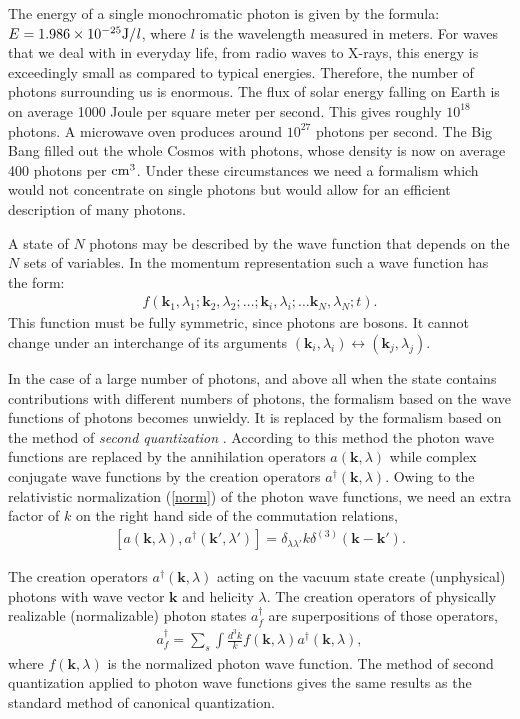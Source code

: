 \documentclass[onecolumn,aps,pra,12pt]{revtex4-1}
\begin{document}
The energy of a single monochromatic photon is given by the formula: $E=1.986\times 10^{-25}\rm{J}/{\it l}$, where $l$ is the wavelength measured in meters.
For waves that we deal with in everyday life, from radio waves to X-rays, this energy is exceedingly small as compared to typical energies. Therefore, the number of photons surrounding us is enormous. The flux of solar energy falling on Earth is on average 1000 Joule per square meter per second. This gives roughly  $10^{18}$ photons. A microwave oven produces around $10^{27}$ photons per second. The Big Bang filled out the whole Cosmos with photons, whose density is now on average 400 photons per $\rm{cm}^3$. Under these circumstances we need a formalism which would not concentrate on single photons but would allow for an efficient description of many photons.

A state of $N$ photons may be described by the wave function that depends on the $N$ sets of variables. In the momentum representation such a wave function has the form:
\begin{align}\label{n}
f({\bm k}_1,\lambda_1;{\bm k}_2,\lambda_2;\dots;{\bm k}_i,\lambda_i;\dots{\bm k}_N,\lambda_N;t).
\end{align}
This function must be fully symmetric, since photons are bosons. It cannot change under an interchange of its arguments $({\bm k}_i,\lambda_i)\leftrightarrow({\bm k}_j,\lambda_j)$.

In the case of a large number of photons, and above all when the state contains contributions with different numbers of photons, the formalism based on the wave functions of photons becomes unwieldy. It is replaced by the formalism based on the method of {\em second quantization} \cite{fw,kobe}. According to this method the photon wave functions are replaced by the annihilation operators $a({\bm k},\lambda)$ while complex conjugate wave functions by the creation operators $a^\dagger({\bm k},\lambda)$. Owing to the relativistic normalization (\ref{norm}) of the photon wave functions, we need an extra factor of $k$ on the right hand side of the commutation relations,
\begin{align}\label{regcom}
[a({\bm k},\lambda),a^\dagger({\bm k}',\lambda')]=\delta_{\lambda\lambda'}k\delta^{(3)}({\bm k}-{\bm k}').
\end{align}

The creation operators $a^\dagger({\bm k},\lambda)$ acting on the vacuum state create (unphysical) photons with wave vector ${\bm k}$ and helicity $\lambda$. The creation operators of physically realizable (normalizable) photon states $a^\dagger_f$ are superpositions of those operators,
\begin{align}\label{coh1}
a^\dagger_f=\sum_{s}\int\frac{d^3k}{k}f({\bm k},\lambda)a^\dagger({\bm k},\lambda),
\end{align}
where $f({\bm k},\lambda)$ is the normalized photon wave function. The method of second quantization applied to photon wave functions gives the same results as the standard method of canonical quantization.
\end{document}
